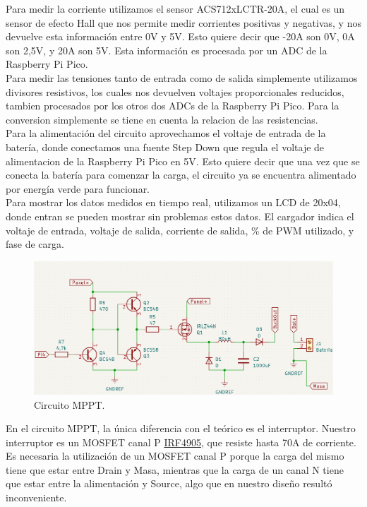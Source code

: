 Para medir la corriente utilizamos el sensor ACS712xLCTR-20A, el cual es un sensor de efecto Hall que nos permite medir corrientes positivas y negativas, y nos devuelve esta información entre 0V y 5V. Esto quiere decir que -20A son 0V, 0A son 2,5V, y 20A son 5V. Esta información es procesada por un ADC de la Raspberry Pi Pico.\\

Para medir las tensiones tanto de entrada como de salida simplemente utilizamos divisores resistivos, los cuales nos devuelven voltajes proporcionales reducidos, tambien procesados por los otros dos ADCs de la Raspberry Pi Pico. Para la conversion simplemente se tiene en cuenta la relacion de las resistencias.\\

Para la alimentación del circuito aprovechamos el voltaje de entrada de la batería, donde conectamos una fuente Step Down que regula el voltaje de alimentacion de la Raspberry Pi Pico en 5V. Esto quiere decir que una vez que se conecta la batería para comenzar la carga, el circuito ya se encuentra alimentado por energía verde para funcionar.\\

Para mostrar los datos medidos en tiempo real, utilizamos un LCD de 20x04, donde entran se pueden mostrar sin problemas estos datos. El cargador indica el voltaje de entrada, voltaje de salida, corriente de salida, \% de PWM utilizado, y fase de carga.\\

\begin{figure}[H]
    \centering
    \includegraphics[width=1\linewidth]{MPPT/Screenshot_7.png}
    \caption{Circuito MPPT.}
    \label{fig:circuito MPPT}
\end{figure}

En el circuito MPPT, la única diferencia con el teórico es el interruptor. Nuestro interruptor es un MOSFET canal P \href{https://www.alldatasheet.es/datasheet-pdf/pdf/683453/KERSEMI/IRF4905.html}{IRF4905}, que resiste hasta 70A de corriente. Es necesaria la utilización de un MOSFET canal P porque la carga del mismo tiene que estar entre Drain y Masa, mientras que la carga de un canal N tiene que estar entre la alimentación y Source, algo que en nuestro diseño resultó inconveniente.\\

